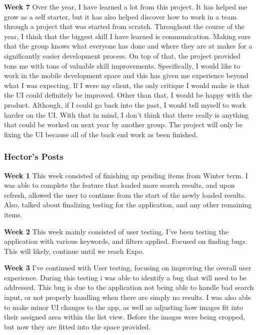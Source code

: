 \documentclass[journal,compsoc, 10pt, draftclsnofoot, onecolumn]{IEEEtran}
\begin{document}
\textbf{Week 7}\newline
Over the year, I have learned a lot from this project. It has helped me grow as a self starter, 
but it has also helped discover how to work in a team through a project that was started from
scratch. Throughout the course of the year, I think that the biggest skill I have learned is
communication. Making sure that the group knows what everyone has done and where they are at
makes for a significantly easier development process. On top of that, the project provided tons 
me with tons of valuable skill improvements. Specifically, I would like to work in the mobile
development space and this has given me experience beyond what I was expecting. If I were my
client, the only critique I would make is that the UI could definitely be improved. Other than
that, I would be happy with the product. Although, if I could go back into the past, I would
tell myself to work harder on the UI. With that in mind, I don't think that there really is
anything that could be worked on next year by another group. The project will only be fixing
the UI because all of the back end work as been finished. \newline


\subsubsection*{Hector's Posts}
\textbf{Week 1}\newline
This week consisted of finishing up pending items from Winter term. I was able to complete the
feature that loaded more search results, and upon refresh, allowed the user to continue from
the start of the newly loaded results. Also, talked about finalizing testing for the
application, and any other remaining items. \newline

\textbf{Week 2}\newline
This week mainly consisted of user testing. I've been testing the application with various
keywords, and filters applied. Focused on finding bugs. This will likely, continue until we
reach Expo.\newline

\textbf{Week 3}\newline
I've continued with User testing, focusing on improving the overall user experience. During
this testing i was able to identify a bug that will need to be addressed. This bug is due to
the application not being able to handle bad search input, or not properly handling when there
are simply no results. I was also able to make minor UI changes to the app, as well as
adjusting how images fit into their assigned area within the list view. Before the images were
being cropped, but now they are fitted into the space provided.\newline
\end{document}
